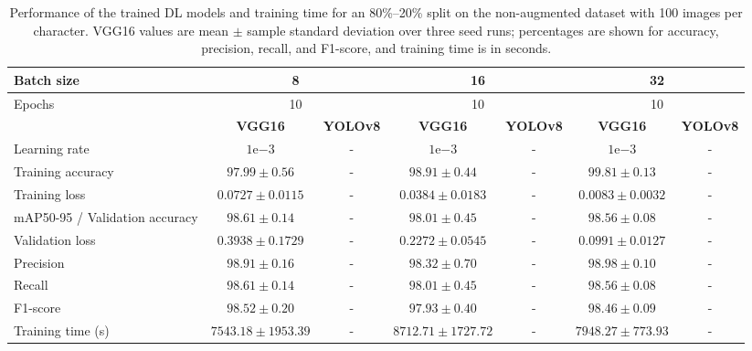 \begin{table}[]
    \centering
    \caption{Performance of the trained DL models and training time for an 80\%--20\% split on the non-augmented dataset with 100 images per character. VGG16 values are mean $\pm$ sample standard deviation over three seed runs; percentages are shown for accuracy, precision, recall, and F1-score, and training time is in seconds.}
    \vspace{0.8em}
    \begin{tabular}{|l|c|c|c|c|c|c|}
    \hline
        Batch size & \multicolumn{2}{c|}{8} & \multicolumn{2}{c|}{16} & \multicolumn{2}{c|}{32} \\
    \hline
        Epochs & \multicolumn{2}{c|}{10} & \multicolumn{2}{c|}{10} & \multicolumn{2}{c|}{10} \\
    \hline
         & \textbf{VGG16} & \textbf{YOLOv8} & \textbf{VGG16} & \textbf{YOLOv8} & \textbf{VGG16} & \textbf{YOLOv8} \\
    \hline
        Learning rate & $1\mathrm{e}{-3}$ & - & $1\mathrm{e}{-3}$ & - & $1\mathrm{e}{-3}$ & - \\
        Training accuracy & $97.99 \pm 0.56$ & - & $98.91 \pm 0.44$ & - & $99.81 \pm 0.13$ & - \\
        Training loss & $0.0727 \pm 0.0115$ & - & $0.0384 \pm 0.0183$ & - & $0.0083 \pm 0.0032$ & - \\
        mAP50-95 / Validation accuracy & $98.61 \pm 0.14$ & - & $98.01 \pm 0.45$ & - & $98.56 \pm 0.08$ & - \\
        Validation loss & $0.3938 \pm 0.1729$ & - & $0.2272 \pm 0.0545$ & - & $0.0991 \pm 0.0127$ & - \\
        Precision & $98.91 \pm 0.16$ & - & $98.32 \pm 0.70$ & - & $98.98 \pm 0.10$ & - \\
        Recall & $98.61 \pm 0.14$ & - & $98.01 \pm 0.45$ & - & $98.56 \pm 0.08$ & - \\
        F1-score & $98.52 \pm 0.20$ & - & $97.93 \pm 0.40$ & - & $98.46 \pm 0.09$ & - \\
        Training time (s) & $7543.18 \pm 1953.39$ & - & $8712.71 \pm 1727.72$ & - & $7948.27 \pm 773.93$ & - \\
    \hline
    \end{tabular}
\end{table}
